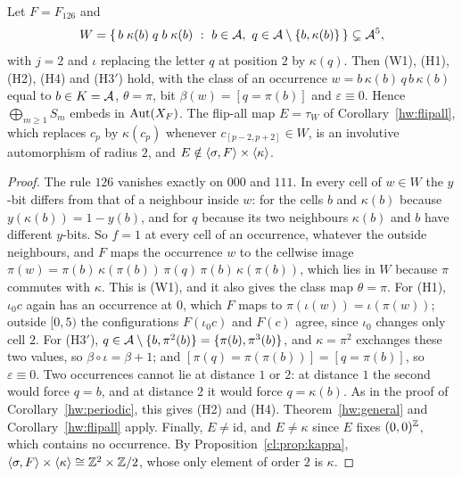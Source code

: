 \begin{proposition}\label{hw:126}
Let $F=F_{126}$ and
\[
W=\{\,b\;\kappa(b)\;q\;b\;\kappa(b)\ :\ b\in\A,\ q\in\A\setminus\{b,\kappa(b)\}\,\}\subsetneq\A^5,
\]
with $j=2$ and $\iota$ replacing the letter $q$ at position $2$ by $\kappa(q)$. Then \textup{(W1)}, \textup{(H1)}, \textup{(H2)}, \textup{(H4)} and \textup{(H3$'$)} hold, with the class of an occurrence $w=b\,\kappa(b)\,q\,b\,\kappa(b)$ equal to $b\in K=\mathcal{A}$, $\theta=\pi$, bit $\beta(w)=[q=\pi(b)]$ and $\varepsilon\equiv0$. Hence $\bigoplus_{m\ge1}S_m$ embeds in $\operatorname{Aut}(X_F)$. The flip-all map $E=\tau_W$ of Corollary~\ref{hw:flipall}, which replaces $c_p$ by $\kappa(c_p)$ whenever $c_{[p-2,p+2]}\in W$, is an involutive automorphism of radius $2$, and $E\notin\langle\sigma,F\rangle\times\langle\kappa\rangle$.
\end{proposition}

\begin{proof}
The rule $126$ vanishes exactly on $000$ and $111$. In every cell of $w\in W$ the $y$-bit differs from that of a neighbour inside $w$: for the cells $b$ and $\kappa(b)$ because $y(\kappa(b))=1-y(b)$, and for $q$ because its two neighbours $\kappa(b)$ and $b$ have different $y$-bits. So $f=1$ at every cell of an occurrence, whatever the outside neighbours, and $F$ maps the occurrence $w$ to the cellwise image $\pi(w)=\pi(b)\,\kappa(\pi(b))\,\pi(q)\,\pi(b)\,\kappa(\pi(b))$, which lies in $W$ because $\pi$ commutes with $\kappa$. This is (W1), and it also gives the class map $\theta=\pi$. For (H1), $\iota_0c$ again has an occurrence at $0$, which $F$ maps to $\pi(\iota(w))=\iota(\pi(w))$; outside $[0,5)$ the configurations $F(\iota_0c)$ and $F(c)$ agree, since $\iota_0$ changes only cell $2$. For (H3$'$), $q\in\mathcal{A}\setminus\{b,\pi^2(b)\}=\{\pi(b),\pi^3(b)\}$, and $\kappa=\pi^2$ exchanges these two values, so $\beta\circ\iota=\beta+1$; and $[\pi(q)=\pi(\pi(b))]=[q=\pi(b)]$, so $\varepsilon\equiv0$. Two occurrences cannot lie at distance $1$ or $2$: at distance $1$ the second would force $q=b$, and at distance $2$ it would force $q=\kappa(b)$. As in the proof of Corollary~\ref{hw:periodic}, this gives (H2) and (H4). Theorem~\ref{hw:general} and Corollary~\ref{hw:flipall} apply. Finally, $E\ne\mathrm{id}$, and $E\ne\kappa$ since $E$ fixes $(0,0)^{\mathbb{Z}}$, which contains no occurrence. By Proposition~\ref{cl:prop:kappa}, $\langle\sigma,F\rangle\times\langle\kappa\rangle\cong\mathbb{Z}^2\times\mathbb{Z}/2$, whose only element of order $2$ is $\kappa$.
\end{proof}

